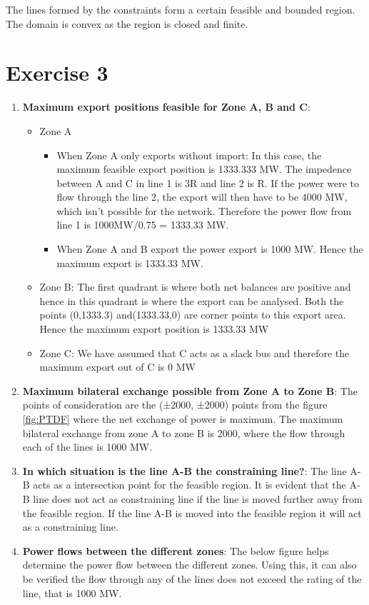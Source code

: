 The lines formed by the constraints form a certain feasible and bounded region. The domain is convex as the region is closed and finite. 

\section*{\textbf{Exercise 3}}

\begin{enumerate}
    \item \textbf{Maximum export positions feasible for Zone A, B and C}:
    \begin{itemize}
        \item Zone A
        \begin{itemize}
            \item When Zone A only exports without import: In this case, the maximum feasible export position is 1333.333 MW. The impedence between A and C in line 1 is 3R and line 2 is R. If the power were to flow through the line 2, the export will then have to be 4000 MW, which isn’t possible for the network. Therefore the power flow from line 1 is 1000MW/0.75 = 1333.33 MW.
            \item When Zone A and B export the power export is 1000 MW. Hence the maximum export is 1333.33 MW.
        \end{itemize}
        \item Zone B: The first quadrant is where both net balances are positive and hence in this quadrant is where the export can be analysed. Both the points (0,1333.3) and(1333.33,0) are corner points to this export area. Hence the maximum export position is 1333.33 MW
        \item Zone C: We have assumed that C acts as a slack bus and therefore the maximum export out of C is 0 MW
    \end{itemize}
    \item \textbf{Maximum bilateral exchange possible from Zone A to Zone B}: The points of consideration are the (±2000, ±2000) points from the figure \ref{fig:PTDF} where the net exchange of power is maximum. The maximum bilateral exchange from zone A to zone B is 2000, where the flow through each of the lines is 1000 MW.
    \item \textbf{In which situation is the line A-B the constraining line?}: The line A-B acts as a intersection point for the feasible region. It is evident that the A-B line does not act as constraining line if the line is moved further away from the feasible region. If the line A-B is moved into the feasible region it will act as a constraining line. 
    \item \textbf{Power flows between the different zones}:
    The below figure helps  determine the power flow between the different zones. Using this, it can also be verified the flow through any of the lines does not exceed the rating of the line, that is 1000 MW.


\end{enumerate}

